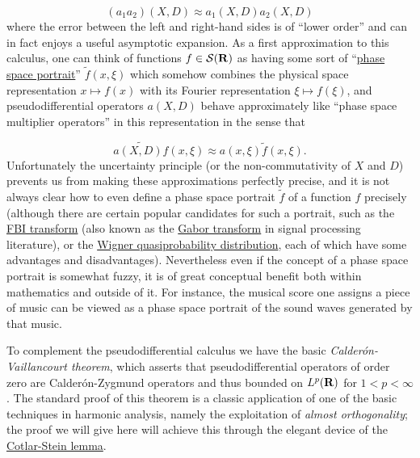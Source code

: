 \documentclass[11pt]{article}
\theoremstyle{definition}
\theoremstyle{remark}
\begin{document}
\[\displaystyle  (a_1 a_2)(X,D) \approx a_1(X,D) a_2(X,D)\]
 where the error between the left and right-hand sides is of “lower order” and can in fact enjoys a useful asymptotic expansion. As a first approximation to this calculus, one can think of functions \({f \in {\mathcal S}({\bf R})}\) as having some sort of “\href{https://en.wikipedia.org/wiki/Phase_portrait}{phase space portrait}” \({\tilde f(x,\xi)}\) which somehow combines the physical space representation \({x \mapsto f(x)}\) with its Fourier representation \({\xi \mapsto f(\xi)}\), and pseudodifferential operators \({a(X,D)}\) behave approximately like “phase space multiplier operators” in this representation in the sense that 

\[\displaystyle  \widetilde{a(X,D) f}(x,\xi) \approx a(x,\xi) \tilde f(x,\xi).\]
 Unfortunately the uncertainty principle (or the non-commutativity of \({X}\) and \({D}\)) prevents us from making these approximations perfectly precise, and it is not always clear how to even define a phase space portrait \({\tilde f}\) of a function \({f}\) precisely (although there are certain popular candidates for such a portrait, such as the \href{https://en.wikipedia.org/wiki/Fourier%E2%80%93Bros%E2%80%93Iagolnitzer_transform}{FBI transform} (also known as the \href{https://en.wikipedia.org/wiki/Gabor_transform}{Gabor transform} in signal processing literature), or the \href{https://en.wikipedia.org/wiki/Wigner_quasiprobability_distribution}{Wigner quasiprobability distribution}, each of which have some advantages and disadvantages). Nevertheless even if the concept of a phase space portrait is somewhat fuzzy, it is of great conceptual benefit both within mathematics and outside of it. For instance, the musical score one assigns a piece of music can be viewed as a phase space portrait of the sound waves generated by that music.


To complement the pseudodifferential calculus we have the basic \emph{Calderón-Vaillancourt theorem}, which asserts that pseudodifferential operators of order zero are Calderón-Zygmund operators and thus bounded on \({L^p({\bf R})}\) for \({1 < p < \infty}\). The standard proof of this theorem is a classic application of one of the basic techniques in harmonic analysis, namely the exploitation of \emph{almost orthogonality}; the proof we will give here will achieve this through the elegant device of the \href{https://en.wikipedia.org/wiki/Cotlar%E2%80%93Stein_lemma}{Cotlar-Stein lemma}.
\end{document}
